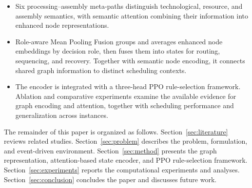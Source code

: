 \begin{itemize}
\item Six processing--assembly meta-paths distinguish technological, resource, and assembly semantics, with semantic attention combining their information into enhanced node representations.

\item Role-aware Mean Pooling Fusion groups and averages enhanced node embeddings by decision role, then fuses them into states for routing, sequencing, and recovery. Together with semantic node encoding, it connects shared graph information to distinct scheduling contexts.

\item The encoder is integrated with a three-head PPO rule-selection framework. Ablation
and comparative experiments examine the available evidence for graph encoding and attention,
together with scheduling performance and generalization across instances.
\end{itemize}


The remainder of this paper is organized as follows. Section~\ref{sec:literature} reviews related studies.
Section~\ref{sec:problem} describes the problem, formulation, and event-driven environment.
Section~\ref{sec:method} presents the graph representation, attention-based state encoder,
and PPO rule-selection framework. Section~\ref{sec:experiments} reports the computational experiments
and analyses. Section~\ref{sec:conclusion} concludes the paper and discusses future work.

